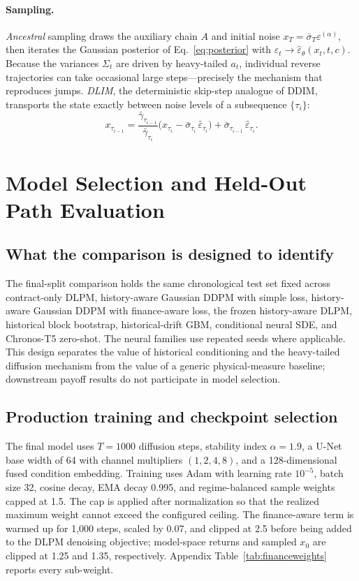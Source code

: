 ﻿\documentclass[12pt,letterpaper]{article}
\begin{document}
\paragraph{Sampling.}
\emph{Ancestral} sampling draws the auxiliary chain $A$ and initial noise
$x_T = \bar\sigma_T \varepsilon^{(\alpha)}$, then iterates the Gaussian
posterior of Eq.~\eqref{eq:posterior} with
$\varepsilon_t \to \hat\varepsilon_\theta(x_t, t, c)$. Because the variances
$\Sigma_t$ are driven by heavy-tailed $a_t$, individual reverse trajectories
can take occasional large steps---precisely the mechanism that reproduces
jumps. \emph{DLIM}, the deterministic skip-step analogue of DDIM, transports
the state exactly between noise levels of a subsequence $\{\tau_i\}$:
\begin{equation}
x_{\tau_{i-1}}
= \frac{\bar\gamma_{\tau_{i-1}}}{\bar\gamma_{\tau_i}}
\bigl(x_{\tau_i} - \bar\sigma_{\tau_i}\,\hat\varepsilon_{\tau_i}\bigr)
+ \bar\sigma_{\tau_{i-1}}\, \hat\varepsilon_{\tau_i}.
\label{eq:dlim}
\end{equation}

\section{Model Selection and Held-Out Path Evaluation}
\label{sec:experiments}

\subsection{What the comparison is designed to identify}

The final-split comparison holds the same chronological test set fixed across
contract-only DLPM, history-aware Gaussian DDPM with simple loss,
history-aware Gaussian DDPM with finance-aware loss, the frozen history-aware
DLPM, historical block bootstrap, historical-drift GBM, conditional neural
SDE, and Chronos-T5 zero-shot.
The neural families use repeated seeds where applicable. This design separates
the value of historical conditioning and the heavy-tailed diffusion mechanism
from the value of a generic physical-measure baseline; downstream payoff
results do not participate in model selection.

\subsection{Production training and checkpoint selection}

The final model uses $T=1000$ diffusion steps, stability index
$\alpha=1.9$, a U-Net base width of 64 with channel multipliers
$(1,2,4,8)$, and a 128-dimensional fused condition embedding. Training uses
Adam with learning rate $10^{-5}$, batch size 32, cosine decay, EMA decay
0.995, and regime-balanced sample weights capped at 1.5. The cap is applied
after normalization so that the realized maximum weight cannot exceed the
configured ceiling. The finance-aware term is warmed up for 1{,}000 steps,
scaled by 0.07, and clipped at 2.5 before being added to the DLPM denoising
objective; model-space returns and sampled $x_0$ are clipped at 1.25 and 1.35,
respectively. Appendix Table~\ref{tab:financeweights} reports every sub-weight.
\end{document}
